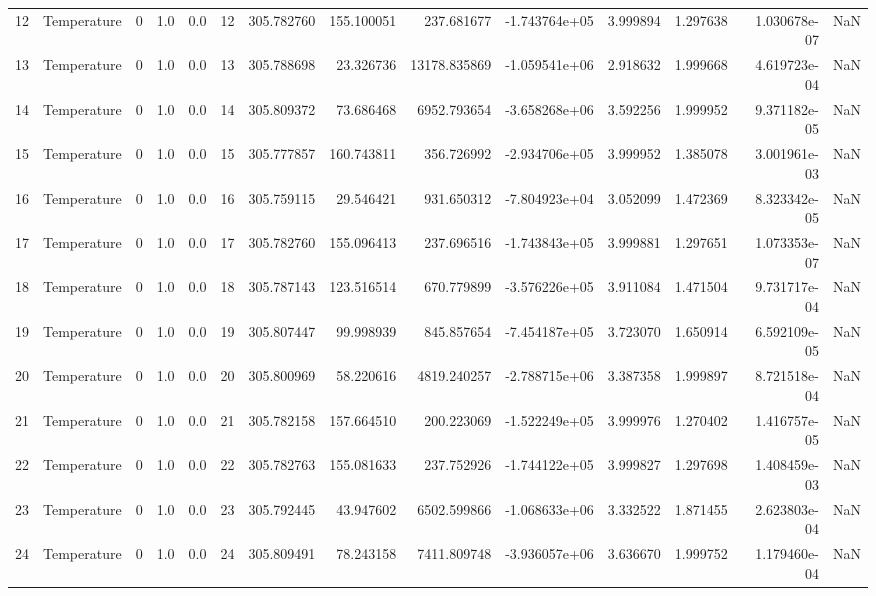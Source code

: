 \begin{tabular}{llrrrrrrrrrrrr}
12  &  Temperature &       0 &  1.0 &  0.0 &   12 &  305.782760 &   155.100051 &     237.681677 & -1.743764e+05 &  3.999894 &  1.297638 &  1.030678e-07 &      NaN \\
13  &  Temperature &       0 &  1.0 &  0.0 &   13 &  305.788698 &    23.326736 &   13178.835869 & -1.059541e+06 &  2.918632 &  1.999668 &  4.619723e-04 &      NaN \\
14  &  Temperature &       0 &  1.0 &  0.0 &   14 &  305.809372 &    73.686468 &    6952.793654 & -3.658268e+06 &  3.592256 &  1.999952 &  9.371182e-05 &      NaN \\
15  &  Temperature &       0 &  1.0 &  0.0 &   15 &  305.777857 &   160.743811 &     356.726992 & -2.934706e+05 &  3.999952 &  1.385078 &  3.001961e-03 &      NaN \\
16  &  Temperature &       0 &  1.0 &  0.0 &   16 &  305.759115 &    29.546421 &     931.650312 & -7.804923e+04 &  3.052099 &  1.472369 &  8.323342e-05 &      NaN \\
17  &  Temperature &       0 &  1.0 &  0.0 &   17 &  305.782760 &   155.096413 &     237.696516 & -1.743843e+05 &  3.999881 &  1.297651 &  1.073353e-07 &      NaN \\
18  &  Temperature &       0 &  1.0 &  0.0 &   18 &  305.787143 &   123.516514 &     670.779899 & -3.576226e+05 &  3.911084 &  1.471504 &  9.731717e-04 &      NaN \\
19  &  Temperature &       0 &  1.0 &  0.0 &   19 &  305.807447 &    99.998939 &     845.857654 & -7.454187e+05 &  3.723070 &  1.650914 &  6.592109e-05 &      NaN \\
20  &  Temperature &       0 &  1.0 &  0.0 &   20 &  305.800969 &    58.220616 &    4819.240257 & -2.788715e+06 &  3.387358 &  1.999897 &  8.721518e-04 &      NaN \\
21  &  Temperature &       0 &  1.0 &  0.0 &   21 &  305.782158 &   157.664510 &     200.223069 & -1.522249e+05 &  3.999976 &  1.270402 &  1.416757e-05 &      NaN \\
22  &  Temperature &       0 &  1.0 &  0.0 &   22 &  305.782763 &   155.081633 &     237.752926 & -1.744122e+05 &  3.999827 &  1.297698 &  1.408459e-03 &      NaN \\
23  &  Temperature &       0 &  1.0 &  0.0 &   23 &  305.792445 &    43.947602 &    6502.599866 & -1.068633e+06 &  3.332522 &  1.871455 &  2.623803e-04 &      NaN \\
24  &  Temperature &       0 &  1.0 &  0.0 &   24 &  305.809491 &    78.243158 &    7411.809748 & -3.936057e+06 &  3.636670 &  1.999752 &  1.179460e-04 &      NaN \\

\end{tabular}

